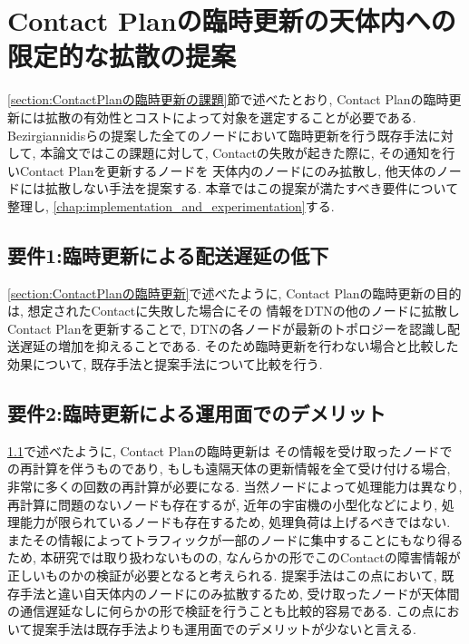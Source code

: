 \chapter{Contact Planの臨時更新の天体内への限定的な拡散の提案}
\label{chap:suggestion}
\ref{section:ContactPlanの臨時更新の課題}節で述べたとおり, 
Contact Planの臨時更新には拡散の有効性とコストによって対象を選定することが必要である. 
Bezirgiannidisらの提案した全てのノードにおいて臨時更新を行う既存手法に対して, 
本論文ではこの課題に対して, Contactの失敗が起きた際に, 
その通知を行いContact Planを更新するノードを
天体内のノードにのみ拡散し, 他天体のノードには拡散しない手法を提案する. 
本章ではこの提案が満たすべき要件について整理し, \ref{chap:implementation_and_experimentation}する. 

\section{要件1:臨時更新による配送遅延の低下}
\label{section:要件1}
\ref{section:ContactPlanの臨時更新}で述べたように, 
Contact Planの臨時更新の目的は, 想定されたContactに失敗した場合にその
情報をDTNの他のノードに拡散しContact Planを更新することで, 
DTNの各ノードが最新のトポロジーを認識し配送遅延の増加を抑えることである. 
そのため臨時更新を行わない場合と比較した効果について, 既存手法と提案手法について比較を行う. 

\section{要件2:臨時更新による運用面でのデメリット}
\label{section:要件2}
\ref{section:要件1}で述べたように, Contact Planの臨時更新は
その情報を受け取ったノードでの再計算を伴うものであり, 
もしも遠隔天体の更新情報を全て受け付ける場合, 
非常に多くの回数の再計算が必要になる. 当然ノードによって処理能力は異なり, 
再計算に問題のないノードも存在するが, 近年の宇宙機の小型化などにより, 
処理能力が限られているノードも存在するため, 処理負荷は上げるべきではない. 
またその情報によってトラフィックが一部のノードに集中することにもなり得るため, 
本研究では取り扱わないものの, なんらかの形でこのContactの障害情報が
正しいものかの検証が必要となると考えられる. 提案手法はこの点において, 
既存手法と違い自天体内のノードにのみ拡散するため, 
受け取ったノードが天体間の通信遅延なしに何らかの形で検証を行うことも比較的容易である. 
この点において提案手法は既存手法よりも運用面でのデメリットが少ないと言える. 